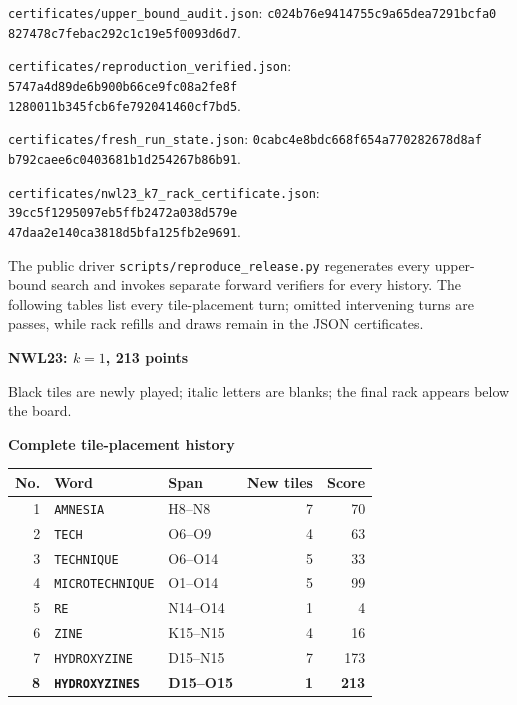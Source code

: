 \documentclass[letterpaper]{article}
\begin{document}
{\texttt{certificates/upper\_bound\_audit.json}: \texttt{c024b76e9414755c9a65dea7291bcfa0}\\\texttt{827478c7febac292c1c19e5f0093d6d7}.\par
\texttt{certificates/reproduction\_verified.json}: \texttt{5747a4d89de6b900b66ce9fc08a2fe8f}\\\texttt{1280011b345fcb6fe792041460cf7bd5}.\par
\texttt{certificates/fresh\_run\_state.json}: \texttt{0cabc4e8bdc668f654a770282678d8af}\\\texttt{b792caee6c0403681b1d254267b86b91}.\par
\texttt{certificates/nwl23\_k7\_rack\_certificate.json}: \texttt{39cc5f1295097eb5ffb2472a038d579e}\\\texttt{47daa2e140ca3818d5bfa125fb2e9691}.\par
The public driver \texttt{scripts/reproduce\_release.py} regenerates every upper-bound search and invokes separate forward verifiers for every history. The following tables list every tile-placement turn; omitted intervening turns are passes, while rack refills and draws remain in the JSON certificates.
}
\clearpage
\begin{center}
{\fontsize{11}{12}\selectfont\bfseries NWL23: $k=1$, 213 points\par}
\vspace{2pt}
\par
\vspace{1pt}
{\fontsize{7.2}{8}\selectfont Black tiles are newly played; italic letters are blanks; the final rack appears below the board.\par}
\vspace{2pt}
{\fontsize{8.5}{9}\selectfont\bfseries Complete tile-placement history\par}
\end{center}
\begin{center}
\fontsize{8.5}{8.8}\selectfont
\setlength{\tabcolsep}{4pt}
\renewcommand{\arraystretch}{0.90}
\begin{tabular}{@{}rllrr@{}}\toprule
No. & Word & Span & New tiles & Score\\
\midrule
1 & \texttt{AMNESIA} & H8--N8 & 7 & 70\\
2 & \texttt{TECH} & O6--O9 & 4 & 63\\
3 & \texttt{TECHNIQUE} & O6--O14 & 5 & 33\\
4 & \texttt{MICROTECHNIQUE} & O1--O14 & 5 & 99\\
5 & \texttt{RE} & N14--O14 & 1 & 4\\
6 & \texttt{ZINE} & K15--N15 & 4 & 16\\
7 & \texttt{HYDROXYZINE} & D15--N15 & 7 & 173\\
\midrule
\textbf{8} & \textbf{\texttt{HYDROXYZINES}} & \textbf{D15--O15} & \textbf{1} & \textbf{213}\\
\bottomrule\end{tabular}
\end{center}
\end{document}
